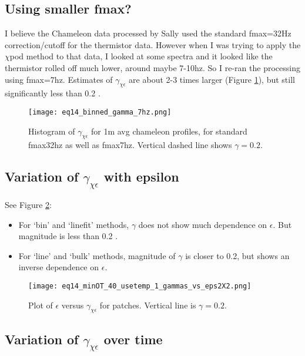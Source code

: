 \documentclass[11pt]{article}
\begin{document}
\clearpage
\subsection{Using smaller fmax?}

I believe the Chameleon data processed by Sally used the standard fmax=32Hz correction/cutoff for the thermistor data. However when I was trying to apply the $\chi$pod method to that data, I looked at some spectra and it looked like the thermistor rolled off much lower, around maybe 7-10hz. So I re-ran the processing using fmax=7hz. Estimates of $\gamma_{\chi\epsilon}$ are about 2-3 times larger (Figure \ref{avggam7hz}), but still significantly less than 0.2 .

\begin{figure}[htbp]
\texttt{[image: eq14\_binned\_gamma\_7hz.png]}
\caption{Histogram of $\gamma_{\chi\epsilon}$ for 1m avg chameleon profiles, for standard fmax32hz as well as fmax7hz. Vertical dashed line shows $\gamma=0.2$.}
\label{avggam7hz}
\end{figure}


\clearpage
\subsection{Variation of $\gamma_{\chi\epsilon}$ with epsilon}

See Figure \ref{epsvsgam}:
\begin{itemize}
\item For `bin' and `linefit' methods, $\gamma$ does not show much dependence on $\epsilon$. But magnitude is less than 0.2 .
\item For `line' and `bulk' methods, magnitude of $\gamma$ is closer to 0.2, but shows an inverse dependence on $\epsilon$.
\end{itemize}


\begin{figure}[htbp]
\texttt{[image: eq14\_minOT\_40\_usetemp\_1\_gammas\_vs\_eps2X2.png]}
\caption{Plot of $\epsilon$  versus $\gamma_{\chi\epsilon}$ for patches.  Vertical line is $\gamma=0.2$.}
\label{epsvsgam}
\end{figure}




\clearpage
\subsection{Variation of $\gamma_{\chi\epsilon}$ over time}
\end{document}
